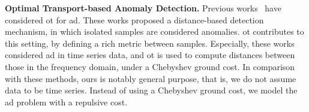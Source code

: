 \noindent\textbf{Optimal Transport-based Anomaly Detection.} Previous works~\citep{alaoui2019unsupervised,alaoui2020semi} have considered \gls{ot} for \gls{ad}. These works proposed a distance-based detection mechanism, in which isolated samples are considered anomalies. \gls{ot} contributes to this setting, by defining a rich metric between samples. Especially, these works considered \gls{ad} in time series data, and \gls{ot} is used to compute distances between those in the frequency domain, under a Chebyshev ground cost. In comparison with these methods, ours is notably general purpose, that is, we do not assume data to be time series. Instead of using a Chebyshev ground cost, we model the \gls{ad} problem with a repulsive cost.